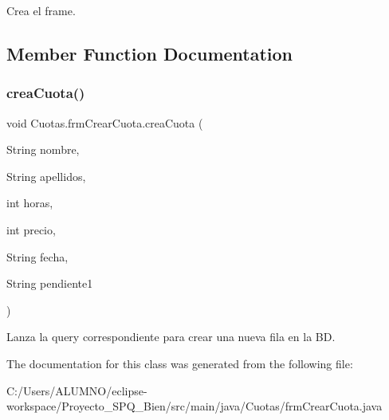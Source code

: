 Crea el frame. 

\subsection{Member Function Documentation}
\mbox{\label{class_cuotas_1_1frm_crear_cuota_ad3c7bc778a21ffc8d1bdc7af6d778a26}} 
\subsubsection{\texorpdfstring{crea\+Cuota()}{creaCuota()}}
{\footnotesize\ttfamily void Cuotas.\+frm\+Crear\+Cuota.\+crea\+Cuota (\begin{DoxyParamCaption}\item[{String}]{nombre,  }\item[{String}]{apellidos,  }\item[{int}]{horas,  }\item[{int}]{precio,  }\item[{String}]{fecha,  }\item[{String}]{pendiente1 }\end{DoxyParamCaption})}

Lanza la query correspondiente para crear una nueva fila en la BD. 

The documentation for this class was generated from the following file\+:\begin{DoxyCompactItemize}
\item 
C\+:/\+Users/\+A\+L\+U\+M\+N\+O/eclipse-\/workspace/\+Proyecto\+\_\+\+S\+P\+Q\+\_\+Bien/src/main/java/\+Cuotas/frm\+Crear\+Cuota.\+java\end{DoxyCompactItemize}
